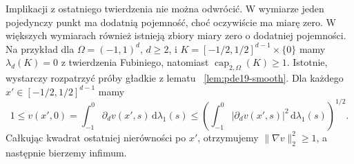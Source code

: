\begin{uwaga}
Implikacji z ostatniego twierdzenia nie można odwrócić.
W wymiarze jeden pojedynczy punkt ma dodatnią pojemność,
choć oczywiście ma miarę zero. W większych wymiarach również istnieją zbiory
miary zero o dodatniej pojemności. Na przykład dla
$\Omega=(-1,1)^d$, $d\ge2$, i
$K=[-1/2,1/2]^{d-1}\times\{0\}$ mamy
$\lambda_d(K)=0$ z twierdzenia Fubiniego, natomiast
$\operatorname{cap}_{2,\Omega}(K)\ge1$.
Istotnie, wystarczy rozpatrzyć próby gładkie z lematu
~\ref{lem:pde19-smooth}. Dla każdego
$x'\in[-1/2,1/2]^{d-1}$ mamy
\[
 1\le v(x',0)=\int_{-1}^0\partial_d v(x',s)
 \,\mathrm d\lambda_1(s)
 \le\left(\int_{-1}^0|\partial_d v(x',s)|^2
 \,\mathrm d\lambda_1(s)\right)^{1/2}.
\]
Całkując kwadrat ostatniej nierówności po $x'$,
otrzymujemy $\|\nabla v\|_2^2\ge1$,
a następnie bierzemy infimum.
\end{uwaga}

